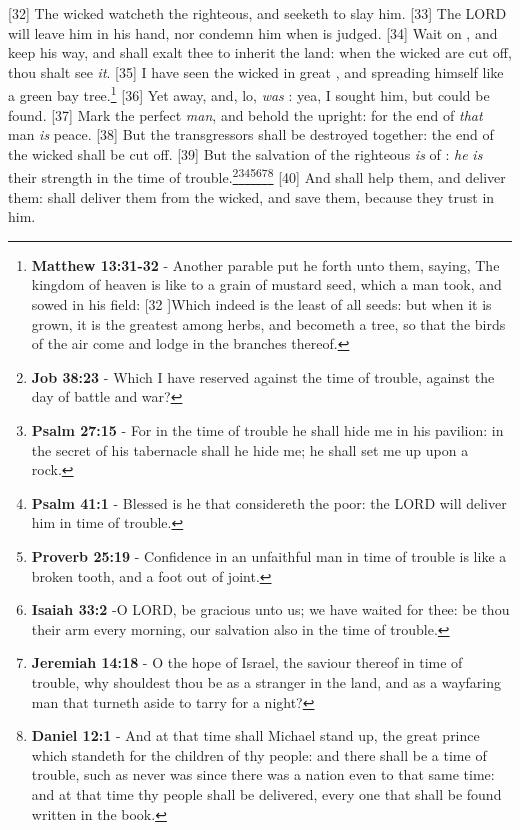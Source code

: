 [32] \textcolor[cmyk]{0.99998,1,0,0}{The wicked watcheth the righteous, and seeketh to slay him.}
[33] \textcolor[cmyk]{0.99998,1,0,0}{The LORD will  leave him in his hand, nor condemn him when  is judged.}
[34] \textcolor[cmyk]{0.99998,1,0,0}{Wait on , and keep his way, and  shall exalt thee to inherit the land: when the wicked are cut off, thou shalt see \emph{it}.}
[35] \textcolor[cmyk]{0.99998,1,0,0}{I have seen the wicked in great , and spreading himself like a green bay tree.}\footnote{\textbf{Matthew 13:31-32} - Another parable put he forth unto them, saying, The kingdom of heaven is like to a grain of mustard seed, which a man took, and sowed in his field: [32 ]Which indeed is the least of all seeds: but when it is grown, it is the greatest among herbs, and becometh a tree, so that the birds of the air come and lodge in the branches thereof.}
[36] \textcolor[cmyk]{0.99998,1,0,0}{Yet   away, and, lo,  \emph{was} : yea, I sought him, but  could  be found.}
[37] \textcolor[cmyk]{0.99998,1,0,0}{Mark the perfect \emph{man}, and behold the upright: for the end of \emph{that} man \emph{is} peace.}
[38] \textcolor[cmyk]{0.99998,1,0,0}{But the transgressors shall be destroyed together: the end of the wicked shall be cut off.}
[39] \textcolor[cmyk]{0.99998,1,0,0}{But the salvation of the righteous \emph{is} of : \emph{he} \emph{is} their strength in the time of trouble.}\footnote{\textbf{Job 38:23} - Which I have reserved against the time of trouble, against the day of battle and war?}\footnote{\textbf{Psalm 27:15} - For in the time of trouble he shall hide me in his pavilion: in the secret of his tabernacle shall he hide me; he shall set me up upon a rock.}\footnote{\textbf{Psalm 41:1} - Blessed is he that considereth the poor: the LORD will deliver him in time of trouble.}\footnote{\textbf{Proverb 25:19} - Confidence in an unfaithful man in time of trouble is like a broken tooth, and a foot out of joint.}\footnote{\textbf{Isaiah 33:2} -O LORD, be gracious unto us; we have waited for thee: be thou their arm every morning, our salvation also in the time of trouble.}\footnote{\textbf{Jeremiah 14:18} - O the hope of Israel, the saviour thereof in time of trouble, why shouldest thou be as a stranger in the land, and as a wayfaring man that turneth aside to tarry for a night?}\footnote{\textbf{Daniel 12:1} - And at that time shall Michael stand up, the great prince which standeth for the children of thy people: and there shall be a time of trouble, such as never was since there was a nation even to that same time: and at that time thy people shall be delivered, every one that shall be found written in the book.}
[40] \textcolor[cmyk]{0.99998,1,0,0}{And  shall help them, and deliver them:  shall deliver them from the wicked, and save them, because they trust in him.}




